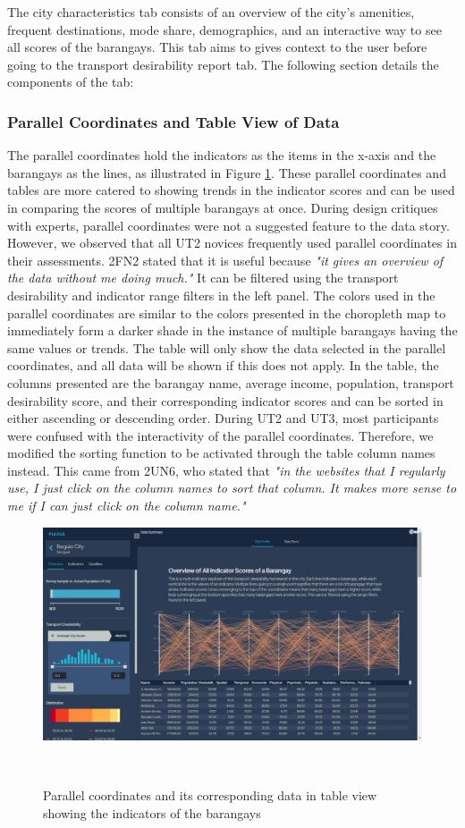 \documentclass{sigchi}
\begin{document}
The city characteristics tab consists of an overview of the city's amenities, frequent destinations, mode share, demographics, and an interactive way to see all scores of the barangays. This tab aims to gives context to the user before going to the transport desirability report tab. The following section details the components of the tab:


\subsubsection{Parallel Coordinates and Table View of Data}
The parallel coordinates hold the indicators as the items in the x-axis and the barangays as the lines, as illustrated in Figure \ref{fig:KeplerParallelCoords}. These parallel coordinates and tables are more catered to showing trends in the indicator scores and can be used in comparing the scores of multiple barangays at once. During design critiques with experts, parallel coordinates were not a suggested feature to the data story. However, we observed that all UT2 novices frequently used parallel coordinates in their assessments. 2FN2 stated that it is useful because \textit{"it gives an overview of the data without me doing much."} It can be filtered using the transport desirability and indicator range filters in the left panel. The colors used in the parallel coordinates are similar to the colors presented in the choropleth map to immediately form a darker shade in the instance of multiple barangays having the same values or trends. The table will only show the data selected in the parallel coordinates, and all data will be shown if this does not apply. In the table, the columns presented are the barangay name, average income, population, transport desirability score, and their corresponding indicator scores and can be sorted in either ascending or descending order. During UT2 and UT3, most participants were confused with the interactivity of the parallel coordinates. Therefore, we modified the sorting function to be activated through the table column names instead. This came from 2UN6, who stated that \textit{"in the websites that I regularly use, I just click on the column names to sort that column. It makes more sense to me if I can just click on the column name."}

\begin{figure}
\centering
  \includegraphics[width=0.9\columnwidth]{figures/latest-screens/pcords.jpg}
  \caption{Parallel coordinates and its corresponding data in table view showing the indicators of the barangays}~\label{fig:KeplerParallelCoords}
\end{figure}
\end{document}
